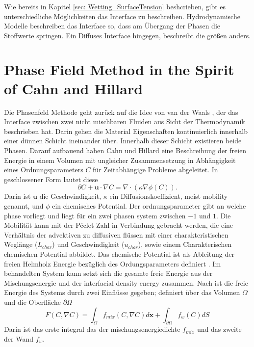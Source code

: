 
Wie bereits in Kapitel \ref{sec: Wetting_SurfaceTension} beshcrieben, gibt es unterschiedliche Möglichkeiten das Interface zu beschreiben. Hydrodynamische Modelle beschreiben das Interface so, dass am Übergang der Phasen die Stoffwerte springen. Ein Diffuses Interface hingegen, beschreibt die größen anders. 

\section{Phase Field Method in the Spirit of Cahn and Hillard}
Die Phasenfeld Methode geht zurück auf die Idee von van der Waals \cite{vanderwaals1979ThermodynamicTheoryCapillarity}, der das Interface zwischen zwei nicht mischbaren Fluiden aus Sicht der Thermodynamik beschrieben hat. Darin gehen die Material Eigenschaften kontinuierlich innerhalb einer dünnen Schicht ineinander über. Innerhalb dieser Schicht existieren beide Phasen. 
Darauf aufbauend haben Cahn und Hillard \cite{johnw.FreeEnergyNonuniform1958} eine Beschreibung der freien Energie in einem Volumen mit ungleicher Zusammensetzung in Abhängigkeit eines Ordnungsparameters $C$ für Zeitabhängige Probleme abgeleitet. In geschlossener Form lautet diese
\begin{equation}
\label{eq: CahnHillard}
    \partial C + \textbf{u} \cdot \nabla C = \nabla \cdot \left(\kappa \nabla \phi(C)\right).
\end{equation}
Darin ist $\textbf{u}$ die Geschwindigkeit, $\kappa$ ein Diffusionskoeffizient, meist mobility genannt, und $\phi$ ein chemisches Potential. Der ordnungsparameter gibt an welche phase vorliegt und liegt für ein zwei phasen system zwischen $-1$ und $1$. Die Mobilität kann mit der Péclet Zahl in Verbindung gebracht werden, die eine Verhältnis der advektiven zu diffusiven flüssen mit einer charakteristischen Weglänge ($L_{char}$) und Geschwindigkeit ($u_{char}$), sowie einem Charakterischen chemischen Potential abbildet\cite{cai2015NumericalSimulationWetting,holzinger2021DirectNumericalSimulation}. 
Das chemische Potential ist als Ableitung der freien Helmholz Energie bezüglich des Ordungsparameters definiert \cite{johnw.FreeEnergyNonuniform1958}. Im behandelten System kann setzt sich die gesamte freie Energie aus der Mischungsenergie und der interfacial density energy zusammen. Nach \cite{yue2010SharpinterfaceLimitCahn} ist die freie Energie des Systems durch zwei Einflüsse gegeben; definiert über das Volumen $\Omega$ und die Oberfläche $\partial\Omega$ 
\begin{equation}
    F(C, \nabla C) = \int_{\Omega} f_{mix} (C, \nabla C) d\textbf{x}+ \int_{\partial\Omega}f_w(C) dS
\end{equation}
Darin ist das erste integral das der mischungsenergiedichte $f_{mix}$ und das zweite der Wand $f_w$.

